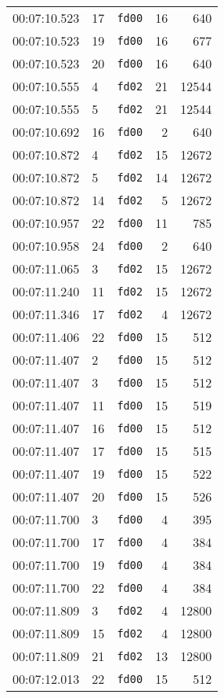 \documentclass{article}
\begin{document}
\begin{longtable}{lllrr}
00:07:10.523 & 17 & \texttt{fd00} & 16 & 640 \\
00:07:10.523 & 19 & \texttt{fd00} & 16 & 677 \\
00:07:10.523 & 20 & \texttt{fd00} & 16 & 640 \\
00:07:10.555 & 4 & \texttt{fd02} & 21 & 12544 \\
00:07:10.555 & 5 & \texttt{fd02} & 21 & 12544 \\
00:07:10.692 & 16 & \texttt{fd00} & 2 & 640 \\
00:07:10.872 & 4 & \texttt{fd02} & 15 & 12672 \\
00:07:10.872 & 5 & \texttt{fd02} & 14 & 12672 \\
00:07:10.872 & 14 & \texttt{fd02} & 5 & 12672 \\
00:07:10.957 & 22 & \texttt{fd00} & 11 & 785 \\
00:07:10.958 & 24 & \texttt{fd00} & 2 & 640 \\
00:07:11.065 & 3 & \texttt{fd02} & 15 & 12672 \\
00:07:11.240 & 11 & \texttt{fd02} & 15 & 12672 \\
00:07:11.346 & 17 & \texttt{fd02} & 4 & 12672 \\
00:07:11.406 & 22 & \texttt{fd00} & 15 & 512 \\
00:07:11.407 & 2 & \texttt{fd00} & 15 & 512 \\
00:07:11.407 & 3 & \texttt{fd00} & 15 & 512 \\
00:07:11.407 & 11 & \texttt{fd00} & 15 & 519 \\
00:07:11.407 & 16 & \texttt{fd00} & 15 & 512 \\
00:07:11.407 & 17 & \texttt{fd00} & 15 & 515 \\
00:07:11.407 & 19 & \texttt{fd00} & 15 & 522 \\
00:07:11.407 & 20 & \texttt{fd00} & 15 & 526 \\
00:07:11.700 & 3 & \texttt{fd00} & 4 & 395 \\
00:07:11.700 & 17 & \texttt{fd00} & 4 & 384 \\
00:07:11.700 & 19 & \texttt{fd00} & 4 & 384 \\
00:07:11.700 & 22 & \texttt{fd00} & 4 & 384 \\
00:07:11.809 & 3 & \texttt{fd02} & 4 & 12800 \\
00:07:11.809 & 15 & \texttt{fd02} & 4 & 12800 \\
00:07:11.809 & 21 & \texttt{fd02} & 13 & 12800 \\
00:07:12.013 & 22 & \texttt{fd00} & 15 & 512 \\

\end{longtable}
\end{document}
